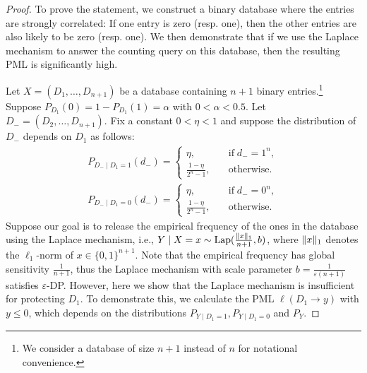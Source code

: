 \begin{proof}
To prove the statement, we construct a binary database where the entries are strongly correlated: If one entry is zero (resp. one), then the other entries are also likely to be zero (resp. one). We then demonstrate that if we use the Laplace mechanism to answer the counting query on this database, then the resulting PML is significantly high.

Let $X = (D_1, \ldots, D_{n +1})$ be a database containing $n+1$ binary entries.\footnote{We consider a database of size $n+1$ instead of $n$ for notational convenience.} Suppose $P_{D_1}(0) = 1 - P_{D_1}(1) = \alpha$ with $0 < \alpha < 0.5$. Let $D_-=(D_2, \ldots, D_{n+1})$. Fix a constant $0 < \eta < 1$ and suppose the distribution of $D_-$ depends on $D_1$ as follows:  
\begin{gather*}
    P_{D_- \mid D_1=1}(d_-) = \begin{cases}
        \eta, &\quad \mathrm{if} \; d_- = 1^{n},\\
        \frac{1 - \eta}{2^{n} -1}, &\quad \mathrm{otherwise}.
    \end{cases}\\
    P_{D_- \mid D_1=0}(d_-) = \begin{cases}
        \eta, &\quad \mathrm{if} \; d_- = 0^{n},\\
        \frac{1 - \eta}{2^{n} -1}, &\quad \mathrm{otherwise}.
    \end{cases}
\end{gather*}
Suppose our goal is to release the empirical frequency of the ones in the database using the Laplace mechanism, i.e., $Y \mid X=x \sim \mathrm{Lap}(\frac{\lVert x\rVert_1}{n+1}, b)$, where $\lVert x\rVert_1$ denotes the $\ell_1$-norm of $x \in \{0,1\}^{n+1}$. Note that the empirical frequency has global sensitivity $\frac{1}{n+1}$, thus the Laplace mechanism with scale parameter $b = \frac{1}{\varepsilon (n+1)}$ satisfies $\varepsilon$-DP. However, here we show that the Laplace mechanism is insufficient for protecting $D_1$. To demonstrate this, we calculate the PML $\ell(D_1 \to y)$ with $y \leq 0$, which depends on the distributions $P_{Y \mid D_1=1}, P_{Y \mid D_1=0}$ and $P_{Y}$. 


\end{proof}
